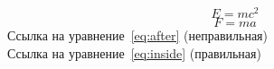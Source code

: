 \documentclass{article}
\begin{document}
\begin{equation}
E = mc^2
\end{equation}
\label{eq:after}
\begin{equation}
F = ma
\label{eq:inside}
\end{equation}
Ссылка на уравнение~\ref{eq:after} (неправильная)\\
Ссылка на уравнение~\ref{eq:inside} (правильная)
\end{document}
